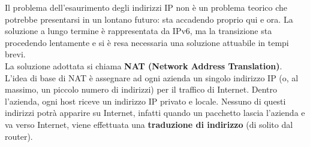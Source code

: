         Il problema dell’esaurimento degli indirizzi IP non è un problema teorico che potrebbe
        presentarsi in un lontano futuro: sta accadendo proprio qui e ora. La soluzione a lungo termine
        è rappresentata da IPv6, ma la transizione sta procedendo lentamente e si è resa necessaria una
        soluzione attuabile in tempi brevi.\\
        La soluzione adottata si chiama \textbf{NAT (Network Address Translation)}. L’idea di base di NAT è
        assegnare ad ogni azienda un singolo indirizzo IP (o, al massimo, un piccolo numero di indirizzi)
        per il traffico di Internet. Dentro l’azienda, ogni host riceve un indirizzo IP privato e locale.
        Nessuno di questi indirizzi potrà apparire su Internet, infatti quando un pacchetto lascia
        l’azienda e va verso Internet, viene effettuata una \textbf{traduzione di indirizzo} (di solito dal router).